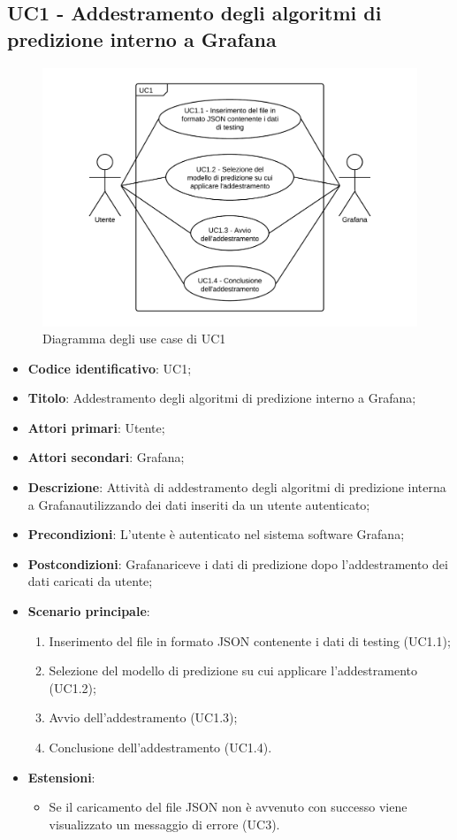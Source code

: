 \subsection{UC1 - Addestramento degli algoritmi di predizione interno a Grafana}
\begin{figure}[H]
\includegraphics{img/UC1_-_Addestramento_degli_algoritmi_di_predizione_interno_a_Grafana.png}
\caption{Diagramma degli use case di UC1}
\end{figure}
\begin{itemize}
	\item \textbf{Codice identificativo}: UC1;
	\item \textbf{Titolo}: Addestramento degli algoritmi di predizione interno a Grafana\glo;
	\item \textbf{Attori primari}: Utente;
	\item \textbf{Attori secondari}: Grafana\glo;
	\item \textbf{Descrizione}: Attività di addestramento degli algoritmi di predizione interna a Grafana\glosp utilizzando dei dati inseriti da un utente autenticato;
	\item \textbf{Precondizioni}: L'utente è autenticato nel sistema software Grafana\glo;
	\item \textbf{Postcondizioni}: Grafana\glosp riceve i dati di predizione dopo l'addestramento dei dati caricati da utente;
	\item \textbf{Scenario principale}: 
		\begin{enumerate}
			\item Inserimento del file in formato JSON contenente i dati di testing (UC1.1);
			\item Selezione del modello di predizione su cui applicare l'addestramento (UC1.2);
			\item Avvio dell'addestramento (UC1.3);
			\item Conclusione dell'addestramento (UC1.4).
		\end{enumerate}
	\item \textbf{Estensioni}:
	\begin{itemize}
		\item Se il caricamento del file JSON non è avvenuto con successo viene visualizzato un messaggio di errore (UC3).
	\end{itemize}
\end{itemize}

